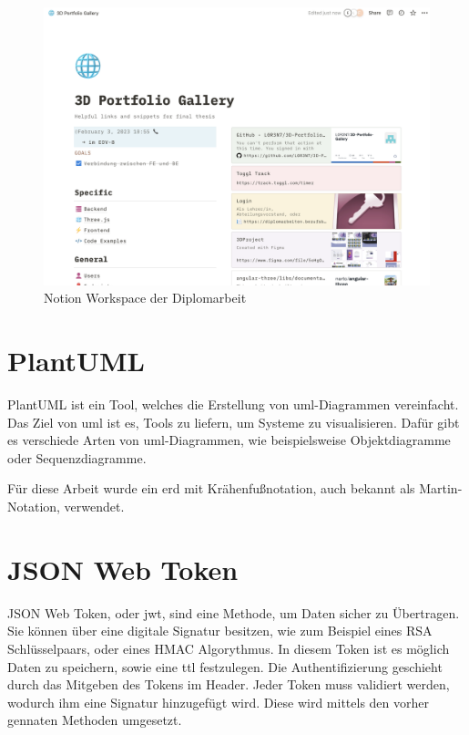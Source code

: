\begin{figure} [h t]
  \centering
  \includegraphics[scale=0.3]{pics/NotionPage.png}
  \caption{Notion Workspace der Diplomarbeit}
  \label{fig:tech:notion-page}
\end{figure}

\section{PlantUML}
PlantUML ist ein Tool, welches die Erstellung von \gls{uml}-Diagrammen vereinfacht. 
Das Ziel von \gls{uml} ist es, Tools zu liefern, um Systeme zu visualisieren.
\cite{UMLPaper}
Dafür gibt es verschiede Arten von \gls{uml}-Diagrammen, wie beispielsweise Objektdiagramme oder Sequenzdiagramme.
\cite{PlantUML}


Für diese Arbeit wurde ein \gls{erd} mit Krähenfußnotation, auch bekannt als Martin-Notation, verwendet.

\section{JSON Web Token}
JSON Web Token, oder \gls{jwt}, sind eine Methode, um Daten sicher zu Übertragen. 
Sie können über eine digitale Signatur besitzen, wie zum Beispiel eines RSA Schlüsselpaars, oder eines HMAC Algorythmus. 
In diesem Token ist es möglich Daten zu speichern, sowie eine \gls{ttl} festzulegen. 
Die Authentifizierung geschieht durch das Mitgeben des Tokens im Header. 
Jeder Token muss validiert werden, wodurch ihm eine Signatur hinzugefügt wird. 
Diese wird mittels den vorher gennaten Methoden umgesetzt. 
\cite{JWTAbout}


